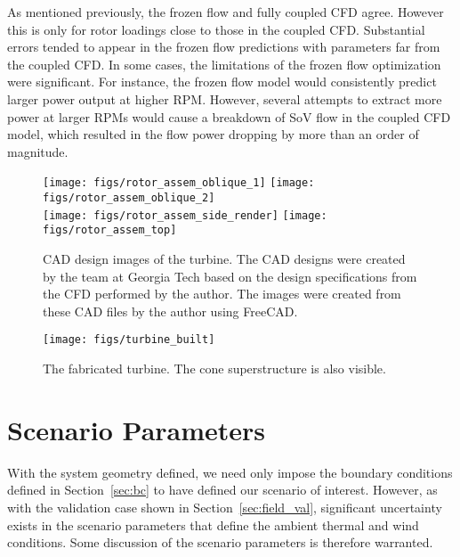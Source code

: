 As mentioned previously, the frozen flow and fully coupled CFD
agree. However this is only for rotor loadings close to those in the
coupled CFD. Substantial errors tended to appear in the frozen flow
predictions with parameters far from the coupled CFD. In some cases, the
limitations of the frozen flow optimization were significant. For
instance, the frozen flow model would consistently predict larger power
output at higher RPM. However, several attempts to extract more power at
larger RPMs would cause a breakdown of SoV flow in the coupled CFD
model, which resulted in the flow power dropping by more than an order
of magnitude.%

  \begin{figure}
   \centering
   \texttt{[image: figs/rotor\_assem\_oblique\_1]}
   \hfill
   \texttt{[image: figs/rotor\_assem\_oblique\_2]}
   \\
   \vspace{1em}
   \texttt{[image: figs/rotor\_assem\_side\_render]}
   \hfill
   \texttt{[image: figs/rotor\_assem\_top]}
   \\   
   \caption{CAD design images of the turbine. The CAD designs were
   created by the team at Georgia Tech based on the design
   specifications from the CFD performed by the author. The images were
   created from these CAD files by the author using
   FreeCAD\cite{Falck}.}  
   \label{fig:cad_turbine}
  \end{figure}


  \begin{figure}
   \centering
   \texttt{[image: figs/turbine\_built]}
   \caption{The fabricated turbine. The cone superstructure is also
   visible.} 
   \label{fig:turbine_built}
  \end{figure}


\section{Scenario Parameters}
\label{subsec:scenario_param}

With the system geometry defined, we need only impose the boundary
conditions defined in Section~\ref{sec:bc} to have defined our
scenario of interest. However, as with the validation case shown in
Section~\ref{sec:field_val}, significant uncertainty exists in the
scenario parameters that define the ambient thermal and wind
conditions. Some discussion of the scenario parameters is therefore
warranted. 

